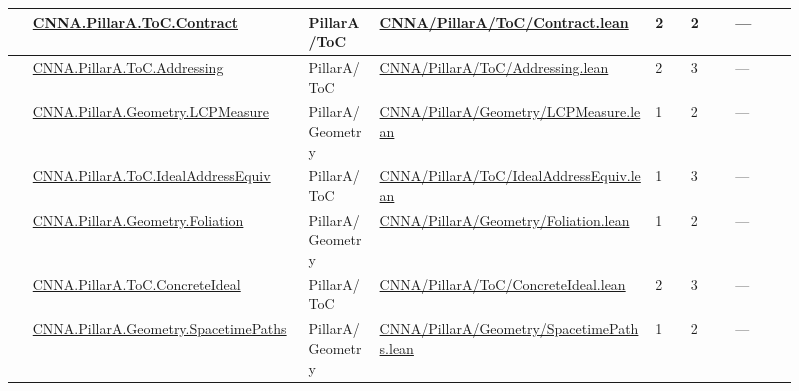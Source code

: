 \begin{longtable}{L{0.025\linewidth} L{0.315\linewidth} L{0.08\linewidth} L{0.315\linewidth} L{0.045\linewidth} L{0.055\linewidth} L{0.07\linewidth}}
\hline
{} & \href{run:repo_snapshot/CNNA/PillarA/ToC/Contract.lean}{CNNA.\allowbreak{}PillarA.\allowbreak{}ToC.\allowbreak{}Contract} & PillarA/\allowbreak{}ToC & \href{run:repo_snapshot/CNNA/PillarA/ToC/Contract.lean}{CNNA/\allowbreak{}PillarA/\allowbreak{}ToC/\allowbreak{}Contract.\allowbreak{}lean} & 2 & 2 & ---\\
\hline
{} & \href{run:repo_snapshot/CNNA/PillarA/ToC/Addressing.lean}{CNNA.\allowbreak{}PillarA.\allowbreak{}ToC.\allowbreak{}Addressing} & PillarA/\allowbreak{}ToC & \href{run:repo_snapshot/CNNA/PillarA/ToC/Addressing.lean}{CNNA/\allowbreak{}PillarA/\allowbreak{}ToC/\allowbreak{}Addressing.\allowbreak{}lean} & 2 & 3 & ---\\
\hline
{} & \href{run:repo_snapshot/CNNA/PillarA/Geometry/LCPMeasure.lean}{CNNA.\allowbreak{}PillarA.\allowbreak{}Geometry.\allowbreak{}LCPMeasure} & PillarA/\allowbreak{}Geometry & \href{run:repo_snapshot/CNNA/PillarA/Geometry/LCPMeasure.lean}{CNNA/\allowbreak{}PillarA/\allowbreak{}Geometry/\allowbreak{}LCPMeasure.\allowbreak{}lean} & 1 & 2 & ---\\
\hline
{} & \href{run:repo_snapshot/CNNA/PillarA/ToC/IdealAddressEquiv.lean}{CNNA.\allowbreak{}PillarA.\allowbreak{}ToC.\allowbreak{}IdealAddressEquiv} & PillarA/\allowbreak{}ToC & \href{run:repo_snapshot/CNNA/PillarA/ToC/IdealAddressEquiv.lean}{CNNA/\allowbreak{}PillarA/\allowbreak{}ToC/\allowbreak{}IdealAddressEquiv.\allowbreak{}lean} & 1 & 3 & ---\\
\hline
{} & \href{run:repo_snapshot/CNNA/PillarA/Geometry/Foliation.lean}{CNNA.\allowbreak{}PillarA.\allowbreak{}Geometry.\allowbreak{}Foliation} & PillarA/\allowbreak{}Geometry & \href{run:repo_snapshot/CNNA/PillarA/Geometry/Foliation.lean}{CNNA/\allowbreak{}PillarA/\allowbreak{}Geometry/\allowbreak{}Foliation.\allowbreak{}lean} & 1 & 2 & ---\\
\hline
{} & \href{run:repo_snapshot/CNNA/PillarA/ToC/ConcreteIdeal.lean}{CNNA.\allowbreak{}PillarA.\allowbreak{}ToC.\allowbreak{}ConcreteIdeal} & PillarA/\allowbreak{}ToC & \href{run:repo_snapshot/CNNA/PillarA/ToC/ConcreteIdeal.lean}{CNNA/\allowbreak{}PillarA/\allowbreak{}ToC/\allowbreak{}ConcreteIdeal.\allowbreak{}lean} & 2 & 3 & ---\\
\hline
{} & \href{run:repo_snapshot/CNNA/PillarA/Geometry/SpacetimePaths.lean}{CNNA.\allowbreak{}PillarA.\allowbreak{}Geometry.\allowbreak{}SpacetimePaths} & PillarA/\allowbreak{}Geometry & \href{run:repo_snapshot/CNNA/PillarA/Geometry/SpacetimePaths.lean}{CNNA/\allowbreak{}PillarA/\allowbreak{}Geometry/\allowbreak{}SpacetimePaths.\allowbreak{}lean} & 1 & 2 & ---\\

\end{longtable}
